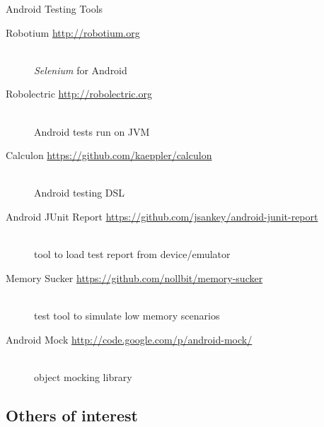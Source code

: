 \documentclass[aspectratio=169]{beamer}
\newcommand{\surl}[1] {{\tiny \url{#1}}}
\begin{document}
    \begin{frame}{Android Testing Tools}
      \begin{description}
        \item[Robotium \surl{http://robotium.org}] \hfill \\ \emph{Selenium} for Android
        \item[Robolectric \surl{http://robolectric.org}] \hfill \\ Android tests run on JVM
        \item[Calculon \surl{https://github.com/kaeppler/calculon}] \hfill \\ Android testing DSL
        \item[Android JUnit Report \surl{https://github.com/jsankey/android-junit-report}] \hfill \\ tool to load test report from device/emulator
        \item[Memory Sucker \surl{https://github.com/nollbit/memory-sucker}] \hfill \\ test tool to simulate low memory scenarios 
        \item[Android Mock \surl{http://code.google.com/p/android-mock/}] \hfill \\ object mocking library
      \end{description}
    \end{frame}


  \subsection{Others of interest}  
\end{document}
